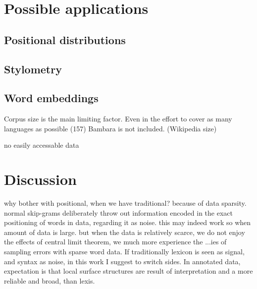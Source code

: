\documentclass[12pt]{article}
\begin{document}


\section{Possible applications}
\label{sec:applications}


\subsection{Positional distributions}


\subsection{Stylometry}





\subsection{Word embeddings}

Corpus size is the main limiting factor. Even in the effort to cover
as many languages as possible (157) Bambara is not
included. (Wikipedia size)


no easily accessable data 

\section{Discussion}

why bother with positional, when we have traditional?  because of data
sparsity. normal skip-grams deliberately throw out information encoded
in the exact positioning of words in data, regarding it as noise. this
may indeed work so when amount of data is large. but when the data is
relatively scarce, we do not enjoy the effects of central limit
theorem, we much more experience the ...ies of sampling errors with
sparse word data. If traditionally lexicon is seen as signal, and
syntax as noise, in this work I suggest to switch sides. In annotated
data, expectation is that local surface structures are result of
interpretation and a more reliable and broad, than lexis. 
\end{document}
